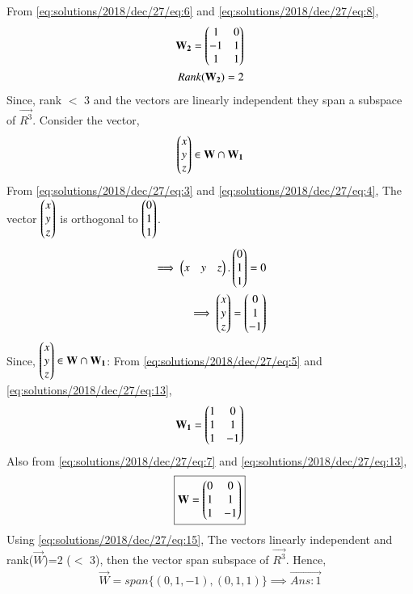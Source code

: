 From \eqref{eq:solutions/2018/dec/27/eq:6} and \eqref{eq:solutions/2018/dec/27/eq:8},
\begin{align}
\mathbf{W_2} = \begin{pmatrix}1 & 0 \\ -1 & 1\\ 1 & 1 \end{pmatrix} \label{eq:solutions/2018/dec/27/eq:9}\\ Rank(\mathbf{W_2})=2
\label{eq:solutions/2018/dec/27/eq:10}
\end{align}
Since, rank $<$ 3 and the vectors are linearly independent they span a subspace of $\vec{R^3}$. \newline \newline
Consider the vector,
\begin{align}
\begin{pmatrix}x\\y\\z\end{pmatrix} \in \mathbf{W} \cap \mathbf{W_1}
\end{align} \newline
From \eqref{eq:solutions/2018/dec/27/eq:3} and \eqref{eq:solutions/2018/dec/27/eq:4}, \newline
The vector $\begin{pmatrix}x\\y\\z\end{pmatrix}$ is orthogonal to $\begin{pmatrix}0 \\ 1 \\ 1\end{pmatrix}$. 
\begin{align}
\implies \begin{pmatrix}x & y & z\end{pmatrix}.\begin{pmatrix}0 \\ 1 \\ 1\end{pmatrix} =0 \\ \implies \begin{pmatrix}x \\ y \\ z\end{pmatrix}=\begin{pmatrix}0 \\ 1 \\ -1\end{pmatrix} \label{eq:solutions/2018/dec/27/eq:13}
\end{align}\newpage
Since, $\begin{pmatrix}x\\y\\z\end{pmatrix} \in \mathbf{W}\cap \mathbf{W_1}$: \newline 
From \eqref{eq:solutions/2018/dec/27/eq:5} and \eqref{eq:solutions/2018/dec/27/eq:13},
\begin{align}
 \mathbf{W_1}=\begin{pmatrix}1 & 0 \\ 1 & 1 \\ 1 & -1\end{pmatrix} 
\end{align}
Also from \eqref{eq:solutions/2018/dec/27/eq:7} and \eqref{eq:solutions/2018/dec/27/eq:13},
\begin{align}
\boxed{\mathbf{W}=\begin{pmatrix}0 & 0 \\ 1 & 1 \\ 1 & -1\end{pmatrix}} \label{eq:solutions/2018/dec/27/eq:15}
\end{align}
Using \eqref{eq:solutions/2018/dec/27/eq:15}, \newline
The vectors linearly independent and rank($\vec{W}$)=2 ($<$ 3), then the vector span subspace of $\vec{R^3}$. \newline \newline
Hence,
\begin{align}
\boxed{\vec{W}= span \{(0,1,-1), (0,1,1)\} \implies \vec{Ans: 1}}
\end{align}
